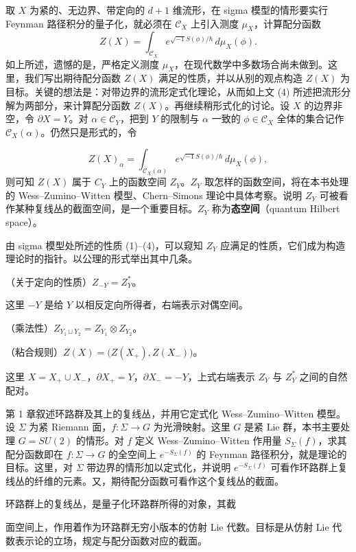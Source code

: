 取 $X$ 为紧的、无边界、带定向的 $d+1$ 维流形，在 sigma 模型的情形要实行 Feynman 路径积分的量子化，就必须在 $\mathcal{C}_X$ 上引入测度 $\mu_X$，计算配分函数
\[
  Z(X)=\int_{\mathcal{C}_X} e^{\sqrt{-1}S(\phi)/\hbar}\,d\mu_X(\phi).
\]
如上所述，遗憾的是，严格定义测度 $\mu_X$，在现代数学中多数场合尚未做到。这里，我们写出期待配分函数 $Z(X)$ 满足的性质，并以从别的观点构造 $Z(X)$ 为目标。关键的想法是：对带边界的流形定式化理论，从而如上文 (4) 所述把流形分解为两部分，来计算配分函数 $Z(X)$。再继续稍形式化的讨论。设 $X$ 的边界非空，令 $\partial X=Y$。对 $\alpha\in\mathcal{C}_Y$，把到 $Y$ 的限制与 $\alpha$ 一致的 $\phi\in\mathcal{C}_X$ 全体的集合记作 $\mathcal{C}_X(\alpha)$。仍然只是形式的，令

\[
  Z(X)_{\alpha}=\int_{\mathcal{C}_X(\alpha)} e^{\sqrt{-1}S(\phi)/\hbar}\,d\mu_X(\phi),
\]
则可知 $Z(X)$ 属于 $C_Y$ 上的函数空间 $Z_Y$。$Z_Y$ 取怎样的函数空间，将在本书处理的 Wess--Zumino--Witten 模型、Chern--Simons 理论中具体考察。说明 $Z_Y$ 可被看作某种复线丛的截面空间，是一个重要目标。$Z_Y$ 称为\textbf{态空间}（quantum Hilbert space）。

由 sigma 模型处所述的性质 (1)--(4)，可以窥知 $Z_Y$ 应满足的性质，它们成为构造理论时的指针。以公理的形式举出其中几条。

\noindent（关于定向的性质）\quad $Z_{-Y}=Z_Y^{*}$。

\noindent 这里 $-Y$ 是给 $Y$ 以相反定向所得者，右端表示对偶空间。

\noindent（乘法性）\quad $Z_{Y_1\sqcup Y_2}=Z_{Y_1}\otimes Z_{Y_2}$。

\noindent（粘合规则）\quad $Z(X)=\bigl(Z(X_+),Z(X_-)\bigr)$。

\noindent 这里 $X=X_+\cup X_-$，$\partial X_+=Y$，$\partial X_-=-Y$，上式右端表示 $Z_Y$ 与 $Z_Y^{*}$ 之间的自然配对。

第 1 章叙述环路群及其上的复线丛，并用它定式化 Wess--Zumino--Witten 模型。设 $\Sigma$ 为紧 Riemann 面，$f\colon\Sigma\to G$ 为光滑映射。这里 $G$ 是紧 Lie 群，本书主要处理 $G=SU(2)$ 的情形。对 $f$ 定义 Wess--Zumino--Witten 作用量 $S_\Sigma(f)$，求其配分函数即在 $f\colon\Sigma\to G$ 的全空间上 $e^{-S_\Sigma(f)}$ 的 Feynman 路径积分，就是理论的目标。这里，对 $\Sigma$ 带边界的情形加以定式化，并说明 $e^{-S_\Sigma(f)}$ 可看作环路群上复线丛的纤维的元素。又，期待配分函数可看作这个复线丛的截面。

环路群上的复线丛，是量子化环路群所得的对象，其截

面空间上，作用着作为环路群无穷小版本的仿射 Lie 代数。目标是从仿射 Lie 代数表示论的立场，规定与配分函数对应的截面。

